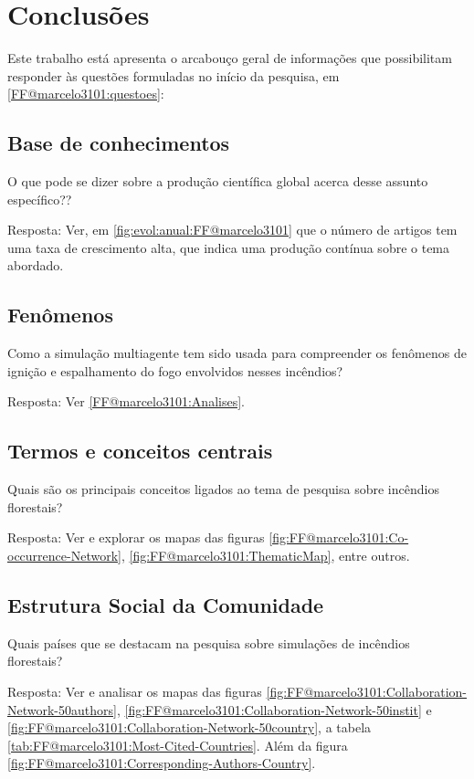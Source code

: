 \section{Conclusões}

Este trabalho está apresenta o arcabouço geral de informações que possibilitam responder às  questões formuladas no início da pesquisa, em \ref{FF@marcelo3101:questoes}:

\subsection{Base de conhecimentos}

O que pode se dizer sobre a produção científica global acerca desse assunto específico?? 
 
Resposta: Ver, em \ref{fig:evol:anual:FF@marcelo3101} que o número de artigos tem uma taxa de crescimento alta, que indica uma produção contínua sobre o tema abordado.

\subsection{Fenômenos}
   
Como a simulação multiagente tem sido usada para compreender os fenômenos de ignição e espalhamento do fogo envolvidos nesses incêndios?

Resposta: Ver \ref{FF@marcelo3101:Analises}.

\subsection{Termos e conceitos centrais}

Quais são os principais conceitos ligados ao tema de pesquisa sobre incêndios florestais? 

Resposta: Ver e explorar os mapas das figuras \ref{fig:FF@marcelo3101:Co-occurrence-Network}, \ref{fig:FF@marcelo3101:ThematicMap}, entre outros.

\subsection{Estrutura Social da Comunidade}

Quais países que se destacam na pesquisa sobre simulações de incêndios florestais?

Resposta: Ver e analisar os mapas das figuras \ref{fig:FF@marcelo3101:Collaboration-Network-50authors}, \ref{fig:FF@marcelo3101:Collaboration-Network-50instit} e \ref{fig:FF@marcelo3101:Collaboration-Network-50country}, a tabela \ref{tab:FF@marcelo3101:Most-Cited-Countries}. Além da figura \ref{fig:FF@marcelo3101:Corresponding-Authors-Country}. 
